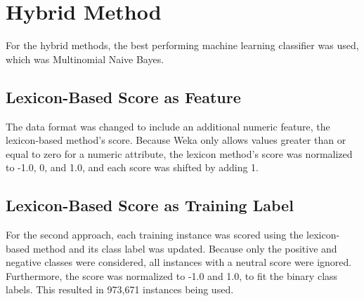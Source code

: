 \section{Hybrid Method}
For the hybrid methods, the best performing machine learning classifier was used, which was Multinomial Naive Bayes.

\subsection{Lexicon-Based Score as Feature}
The data format was changed to include an additional numeric feature, the lexicon-based method's score. Because Weka only allows values greater than or equal to zero for a numeric attribute, the lexicon method's score was normalized to -1.0, 0, and 1.0, and each score was shifted by adding 1.

\subsection{Lexicon-Based Score as Training Label}
For the second approach, each training instance was scored using the lexicon-based method and its class label was updated. Because only the positive and negative classes were considered, all instances with a neutral score were ignored. Furthermore, the score was normalized to -1.0 and 1.0, to fit the binary class labels. This resulted in 973,671 instances being used.




